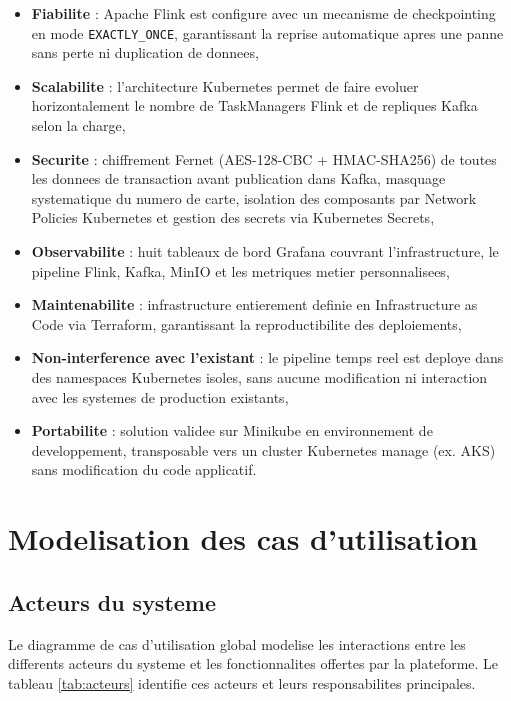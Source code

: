\begin{itemize}
    \item \textbf{Fiabilite} : Apache Flink est configure avec un mecanisme de
    checkpointing en mode \texttt{EXACTLY\_ONCE}, garantissant la reprise automatique
    apres une panne sans perte ni duplication de donnees,
    \item \textbf{Scalabilite} : l'architecture Kubernetes permet de faire evoluer
    horizontalement le nombre de TaskManagers Flink et de repliques Kafka selon la
    charge,
    \item \textbf{Securite} : chiffrement Fernet (AES-128-CBC + HMAC-SHA256) de
    toutes les donnees de transaction avant publication dans Kafka, masquage
    systematique du numero de carte, isolation des composants par Network Policies
    Kubernetes et gestion des secrets via Kubernetes Secrets,
    \item \textbf{Observabilite} : huit tableaux de bord Grafana couvrant
    l'infrastructure, le pipeline Flink, Kafka, MinIO et les metriques metier
    personnalisees,
    \item \textbf{Maintenabilite} : infrastructure entierement definie en Infrastructure
    as Code via Terraform, garantissant la reproductibilite des deploiements,
    \item \textbf{Non-interference avec l'existant} : le pipeline temps reel est
    deploye dans des namespaces Kubernetes isoles, sans aucune modification ni
    interaction avec les systemes de production existants,
    \item \textbf{Portabilite} : solution validee sur Minikube en environnement de
    developpement, transposable vers un cluster Kubernetes manage (ex. AKS) sans
    modification du code applicatif.
\end{itemize}

\section{Modelisation des cas d'utilisation}
\label{sec:uc}

\subsection{Acteurs du systeme}

Le diagramme de cas d'utilisation global modelise les interactions entre les
differents acteurs du systeme et les fonctionnalites offertes par la plateforme. Le
tableau \ref{tab:acteurs} identifie ces acteurs et leurs responsabilites principales.

